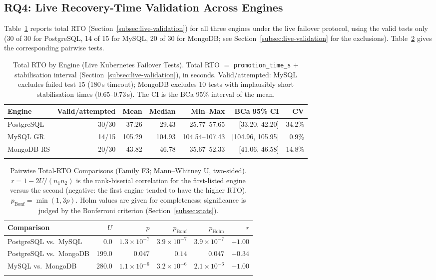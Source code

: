 \documentclass[iicol,pdflatex,sn-mathphys-num]{sn-jnl}
\theoremstyle{thmstyleone}
\theoremstyle{thmstylethree}
\begin{document}
\subsection{RQ4: Live Recovery-Time Validation Across Engines}\label{subsec:rq4}

Table~\ref{tab:rto-results} reports total RTO (Section~\ref{subsec:live-validation})
for all three engines under the live failover protocol, using the
valid tests only (30 of 30 for PostgreSQL, 14 of 15 for MySQL, 20 of 30
for MongoDB; see Section~\ref{subsec:live-validation} for the
exclusions). Table~\ref{tab:rto-tests} gives the corresponding pairwise
tests.

\begin{table}[t]
\caption{Total RTO by Engine (Live Kubernetes Failover Tests). Total RTO
$=$ \texttt{promotion\_time\_s} $+$ stabilisation interval
(Section~\ref{subsec:live-validation}), in seconds. Valid/attempted:
MySQL excludes failed test 15 (180\,s timeout); MongoDB excludes 10
tests with implausibly short stabilisation times (0.65--0.73\,s). The
CI is the BCa 95\% interval of the mean.}\label{tab:rto-results}
\begin{tabular}{@{}lrrrrrr@{}}
\toprule
Engine & Valid/attempted & Mean & Median & Min--Max & BCa 95\% CI & CV \\
\midrule
PostgreSQL & 30/30 & 37.26 & 29.43 & 25.77--57.65 & [33.20, 42.20] & 34.2\% \\
MySQL GR   & 14/15 & 105.29 & 104.93 & 104.54--107.43 & [104.96, 105.95] & 0.9\% \\
MongoDB RS & 20/30 & 43.82 & 46.78 & 35.67--52.33 & [41.06, 46.58] & 14.8\% \\
\botrule
\end{tabular}
\end{table}

\begin{table}[t]
\caption{Pairwise Total-RTO Comparisons (Family F3; Mann--Whitney U,
two-sided). $r=1-2U/(n_1n_2)$ is the rank-biserial correlation for the
first-listed engine versus the second (negative: the first engine tended
to have the higher RTO). $p_{\text{Bonf}}=\min(1,3p)$. Holm values are given for
completeness; significance is judged by the Bonferroni criterion
(Section~\ref{subsec:stats}).}\label{tab:rto-tests}
\begin{tabular}{@{}lrrrrr@{}}
\toprule
Comparison & $U$ & $p$ & $p_{\text{Bonf}}$ & $p_{\text{Holm}}$ & $r$ \\
\midrule
PostgreSQL vs.\ MySQL   & 0.0   & $1.3\times10^{-7}$ & $3.9\times10^{-7}$ & $3.9\times10^{-7}$ & $+1.00$ \\
PostgreSQL vs.\ MongoDB & 199.0 & $0.047$ & $0.14$ & $0.047$ & $+0.34$ \\
MySQL vs.\ MongoDB      & 280.0 & $1.1\times10^{-6}$ & $3.2\times10^{-6}$ & $2.1\times10^{-6}$ & $-1.00$ \\
\botrule
\end{tabular}
\end{table}
\end{document}
